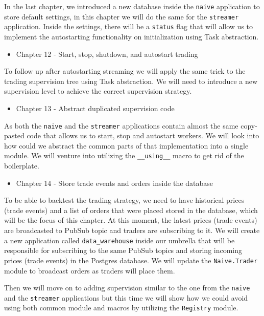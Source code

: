 \documentclass[
  oneside]{book}
\providecommand{\tightlist}{%
  \setlength{\itemsep}{0pt}\setlength{\parskip}{0pt}}
\begin{document}
In the last chapter, we introduced a new database inside the \texttt{naive} application to store default settings, in this chapter we will do the same for the \texttt{streamer} application. Inside the settings, there will be a \texttt{status} flag that will allow us to implement the autostarting functionality on initialization using Task abstraction.

\begin{itemize}
\tightlist
\item
  Chapter 12 - Start, stop, shutdown, and autostart trading
\end{itemize}

To follow up after autostarting streaming we will apply the same trick to the trading supervision tree using Task abstraction. We will need to introduce a new supervision level to achieve the correct supervision strategy.

\begin{itemize}
\tightlist
\item
  Chapter 13 - Abstract duplicated supervision code
\end{itemize}

As both the \texttt{naive} and the \texttt{streamer} applications contain almost the same copy-pasted code that allows us to start, stop and autostart workers. We will look into how could we abstract the common parts of that implementation into a single module. We will venture into utilizing the \texttt{\_\_using\_\_} macro to get rid of the boilerplate.

\begin{itemize}
\tightlist
\item
  Chapter 14 - Store trade events and orders inside the database
\end{itemize}

To be able to backtest the trading strategy, we need to have historical prices (trade events) and a list of orders that were placed stored in the database, which will be the focus of this chapter. At this moment, the latest prices (trade events) are broadcasted to PubSub topic and traders are subscribing to it. We will create a new application called \texttt{data\_warehouse} inside our umbrella that will be responsible for subscribing to the same PubSub topics and storing incoming prices (trade events) in the Postgres database. We will update the \texttt{Naive.Trader} module to broadcast orders as traders will place them.

Then we will move on to adding supervision similar to the one from the \texttt{naive} and the \texttt{streamer} applications but this time we will show how we could avoid using both common module and macros by utilizing the \texttt{Registry} module.
\end{document}
